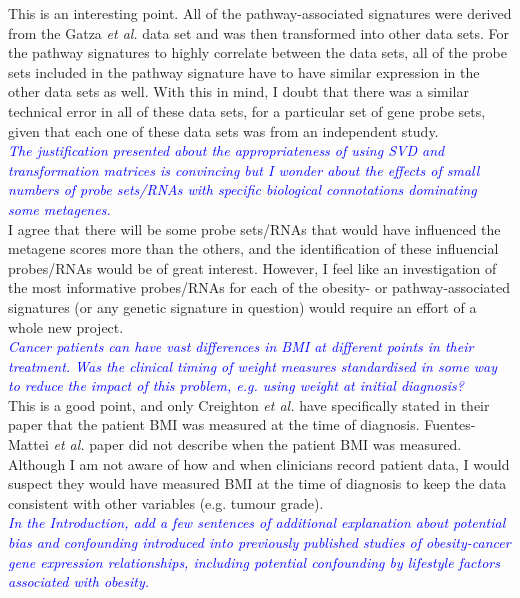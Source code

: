 \documentclass[a4paper, 12pt]{article}
\begin{document}
\noindent
This is an interesting point.
All of the pathway-associated signatures were derived from the Gatza \textit{et al.} data set and was then transformed into other data sets.
For the pathway signatures to highly correlate between the data sets, all of the probe sets included in the pathway signature have to have similar expression in the other data sets as well.
With this in mind, I doubt that there was a similar technical error in all of these data sets, for a particular set of gene probe sets, given that each one of these data sets was from an independent study.
\\

\noindent
\textcolor{blue}{
	\textit{The justification presented about the appropriateness of using SVD and transformation matrices is convincing but I wonder about the effects of small numbers of probe sets/RNAs with specific biological connotations dominating some metagenes.
	}
}\\

\noindent
I agree that there will be some probe sets/RNAs that would have influenced the metagene scores more than the others, and the identification of these influencial probes/RNAs would be of great interest.
However, I feel like an investigation  of the most informative probes/RNAs for each of the obesity- or pathway-associated signatures (or any genetic signature in question) would require an effort of a whole new project.
\\

\noindent
\textcolor{blue}{
	\textit{Cancer patients can have vast differences in BMI at different points in their treatment.
	Was the clinical timing of weight measures standardised in some way to reduce the impact of this problem, e.g. using weight at initial diagnosis?
	}
}\\

\noindent
This is a good point, and only Creighton \textit{et al.} have specifically stated in their paper that the patient BMI was measured at the time of diagnosis.
Fuentes-Mattei \textit{et al.} paper did not describe when the patient BMI was measured.
Although I am not aware of how and when clinicians record patient data, I would suspect they would have measured BMI at the time of diagnosis to keep the data consistent with other variables (e.g. tumour grade).
\\

\noindent
\textcolor{blue}{
	\textit{In the Introduction, add a few sentences of additional explanation about potential bias and confounding introduced into previously published studies of obesity-cancer gene expression relationships, including potential confounding by lifestyle factors associated with obesity.
	}
}\\
\end{document}
